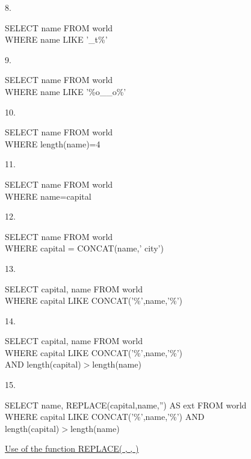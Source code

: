 \documentclass[10pt, oneside]{article}
\begin{document}
\begin{itemize}
\begin{center}
	\end{center}
	8.
	\begin{center}
		\begin{minipage}{.6\linewidth}
			SELECT name FROM world \\
			WHERE name LIKE '\_t\%'
		\end{minipage}
	\end{center}
	9.
	\begin{center}
		\begin{minipage}{.6\linewidth}
			SELECT name FROM world \\
			WHERE name LIKE '\%o\_\_o\%'
		\end{minipage}
	\end{center}
	10.
	\begin{center}
		\begin{minipage}{.6\linewidth}
			SELECT name FROM world \\
			WHERE length(name)=4
		\end{minipage}
	\end{center}
	11.
	\begin{center}
		\begin{minipage}{.6\linewidth}
			SELECT name FROM world \\
			WHERE name=capital
		\end{minipage}
	\end{center}
	12.
	\begin{center}
		\begin{minipage}{.6\linewidth}
			SELECT name FROM world \\
			WHERE capital = CONCAT(name,' city')
		\end{minipage}
	\end{center}
	13.
	\begin{center}
		\begin{minipage}{.6\linewidth}
		SELECT capital, name FROM world \\
		WHERE capital LIKE CONCAT('\%',name,'\%')	
		\end{minipage}
	\end{center}
	14.
	\begin{center}
		\begin{minipage}{.6\linewidth}
			SELECT capital, name FROM world \\
			WHERE capital LIKE CONCAT('\%',name,'\%') \\
			AND length(capital)$>$length(name)
		\end{minipage}
	\end{center}
	15.
	\begin{center}
		\begin{minipage}{.6\linewidth}
			\color{red}SELECT name, REPLACE(capital,name,'') AS ext FROM world \\
			WHERE capital LIKE CONCAT('\%',name,'\%') AND \\
			length(capital)$>$length(name)
		\end{minipage}
	\end{center}

	\href{https://sqlzoo.net/wiki/REPLACE}{Use of the function REPLACE( , , )}
	
\end{itemize}
\end{document}
